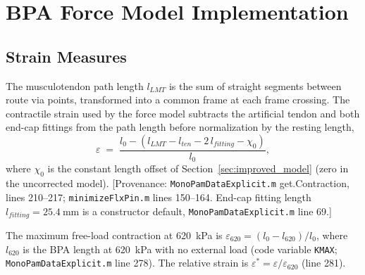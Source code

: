 
    


\section{BPA Force Model Implementation}

\subsection{Strain Measures}
The musculotendon path length $l_{LMT}$ is the sum of straight segments between route via points, transformed into a common frame at each frame crossing. The contractile strain used by the force model subtracts the artificial tendon and both end-cap fittings from the path length before normalization by the resting length,
\begin{equation}
    \varepsilon \;=\; \frac{l_{0} - \left(l_{LMT} - l_{ten} - 2\,l_{fitting} - \chi_{0}\right)}{l_{0}},
    \label{eq:app_strain}
\end{equation}
where $\chi_{0}$ is the constant length offset of Section~\ref{sec:improved_model} (zero in the uncorrected model). [Provenance: \texttt{MonoPamDataExplicit.m} get.Contraction, lines 210--217; \texttt{minimizeFlxPin.m} lines 150--164. End-cap fitting length $l_{fitting}=\qty{25.4}{\mm}$ is a constructor default, \texttt{MonoPamDataExplicit.m} line 69.]

The maximum free-load contraction at \qty{620}{\kPa} is $\varepsilon_{620} = (l_{0}-l_{620})/l_{0}$, where $l_{620}$ is the BPA length at \qty{620}{\kPa} with no external load (code variable \texttt{KMAX}; \texttt{MonoPamDataExplicit.m} line 278). The relative strain is $\varepsilon^{*} = \varepsilon / \varepsilon_{620}$ (line 281).

